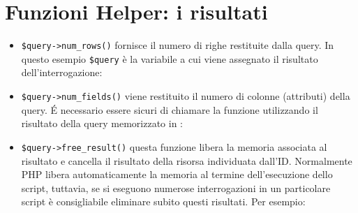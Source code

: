 \section*{Funzioni Helper: i risultati}
\begin{itemize}
\item \verb|$query->num_rows()| fornisce il numero di righe restituite dalla query. In questo esempio \verb|$query| è la variabile a cui viene assegnato il risultato dell'interrogazione:



\item \verb|$query->num_fields()| viene restituito il numero di colonne (attributi) della query. \'E necessario essere sicuri di chiamare la funzione utilizzando il risultato della query memorizzato in :


\item \verb|$query->free_result()| questa funzione libera la memoria associata al risultato e cancella il risultato della risorsa individuata dall'ID. Normalmente \ac{PHP} libera automaticamente la memoria al termine dell'esecuzione dello script, tuttavia, se si eseguono numerose interrogazioni in un particolare script è consigliabile eliminare subito questi risultati. Per esempio:

\end{itemize}
